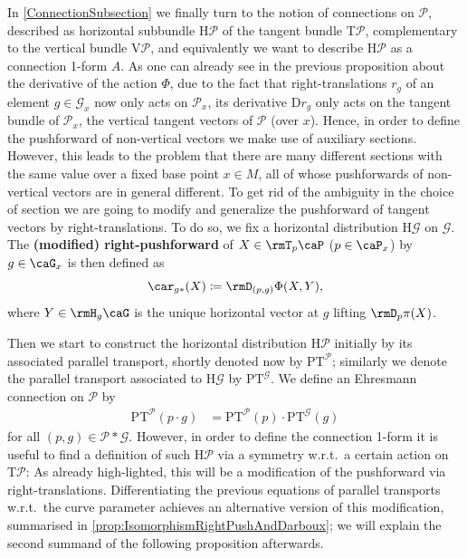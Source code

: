 \documentclass[reqno,a4paper,oneside]{amsart}
\theoremstyle{plain}
\theoremstyle{remark}
\theoremstyle{definition}
\begin{document}
In \ref{ConnectionSubsection} we finally turn to the notion of connections on $\mathcal{P}$, described as horizontal subbundle $\mathrm{H}\mathcal{P}$ of the tangent bundle $\mathrm{T}\mathcal{P}$, complementary to the vertical bundle $\mathrm{V}\mathcal{P}$, and equivalently we want to describe $\mathrm{H}\mathcal{P}$ as a connection 1-form $A$. As one can already see in the previous proposition about the derivative of the action $\Phi$, due to the fact that right-translations $r_g$ of an element $g \in \mathcal{G}_x$ now only acts on $\mathcal{P}_x$, its derivative $\mathrm{D}r_g$ only acts on the tangent bundle of $\mathcal{P}_x$, the vertical tangent vectors of $\mathcal{P}$ (over $x$). Hence, in order to define the pushforward of non-vertical vectors we make use of auxiliary sections. However, this leads to the problem that there are many different sections with the same value over a fixed base point $x \in M$, all of whose pushforwards of non-vertical vectors are in general different. To get rid of the ambiguity in the choice of section we are going to modify and generalize the pushforward of tangent vectors by right-translations. To do so, we fix a horizontal distribution $\mathrm{H}\mathcal{G}$ on $\mathcal{G}$. The \textbf{(modified) right-pushforward} of $X \in \rmT_p \caP$ ($p \in \caP_x$) by $g \in \caG_x$ is then defined as
\begin{equation*}
\car_{g*}(X) \coloneqq \rmD_{(p, g)}\Phi(X, Y),
\end{equation*}
where $Y \in \rmH_g\caG$ is the unique horizontal vector at $g$ lifting $\rmD_p\pi(X)$.

Then we start to construct the horizontal distribution $\mathrm{H}\mathcal{P}$ initially by its associated parallel transport, shortly denoted now by $\mathrm{PT}^{\mathcal{P}}$; similarly we denote the parallel transport associated to $\mathrm{H}\mathcal{G}$ by $\mathrm{PT}^{\mathcal{G}}$. We define an Ehresmann connection on $\mathcal{P}$ by
\begin{align*}
\mathrm{PT}^{\mathcal{P}}(p \cdot g)
&=
\mathrm{PT}^{\mathcal{P}}(p) \cdot \mathrm{PT}^{\mathcal{G}}(g)
\end{align*}
for all $(p, g) \in \mathcal{P}*\mathcal{G}$. However, in order to define the connection 1-form it is useful to find a definition of such $\mathrm{H}\mathcal{P}$ via a symmetry w.r.t.\ a certain action on $\mathrm{T}\mathcal{P}$: As already high-lighted, this will be a modification of the pushforward via right-translations. Differentiating the previous equations of parallel transports w.r.t.\ the curve parameter achieves an alternative version of this modification, summarised in \ref{prop:IsomorphismRightPushAndDarboux}; we will explain the second summand of the following proposition afterwards.
\end{document}
